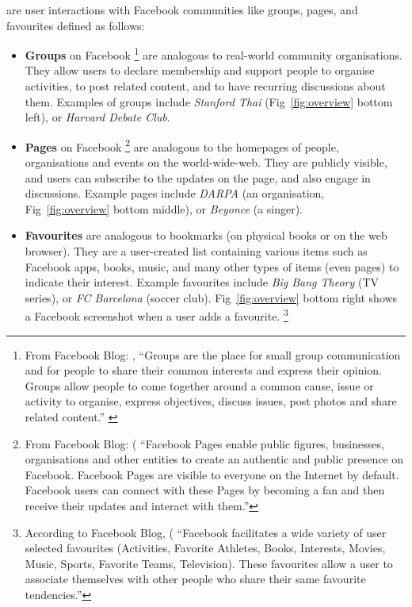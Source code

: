  are user interactions with Facebook
communities like groups, pages, and favourites defined as follows:
\begin{itemize}
  \item \textbf{Groups} on Facebook 
\footnote{From Facebook Blog: 
, ``Groups are the place for small group communication and for people to share their common interests and express their opinion. Groups allow people to come together around a common cause, issue or activity to organise, express objectives, discuss issues, post photos and share related content.'' 
\label{fn:fbblog}}
are analogous to real-world community organisations.  They allow 
  users to declare membership and support people to organise
  activities, to post related content, and to have recurring
  discussions about them.  Examples of groups include {\em Stanford
  Thai} (Fig~\ref{fig:overview} bottom left), or {\em Harvard Debate
  Club}.  

\item \textbf{Pages} on Facebook \footnote{From Facebook
  Blog:
  (
  ``Facebook Pages enable public figures, businesses, organisations
  and other entities to create an authentic and public presence on
  Facebook. Facebook Pages are visible to everyone on the Internet by
  default. Facebook users can connect with these Pages by becoming a
  fan and then receive their updates and interact with them.'' }
  are analogous to the homepages of people, organisations and events
  on the world-wide-web. They are publicly visible, and users can
  subscribe to the updates on the page, and also engage in
  discussions. Example pages include {\em DARPA} (an organisation,
  Fig~\ref{fig:overview} bottom middle), or {\em Beyonce} (a singer).

  \item \textbf{Favourites} are analogous to bookmarks (on physical
  books or on the web browser).  They are a user-created list containing
  various items such as Facebook apps, books, music, and many other
  types of items (even pages) to indicate their interest.  Example favourites 
  include {\em Big Bang Theory} (TV series), or {\em FC Barcelona}
  (soccer club). Fig~\ref{fig:overview} bottom right shows a Facebook
  screenshot when a user adds a favourite.  \footnote{According to
  Facebook Blog, (
  ``Facebook facilitates a wide variety of user selected favourites
  (Activities, Favorite Athletes, Books, Interests, Movies, Music,
  Sports, Favorite Teams, Television). These favourites allow a user
  to associate themselves with other people who share their same
  favourite tendencies.''}
\end{itemize} 

